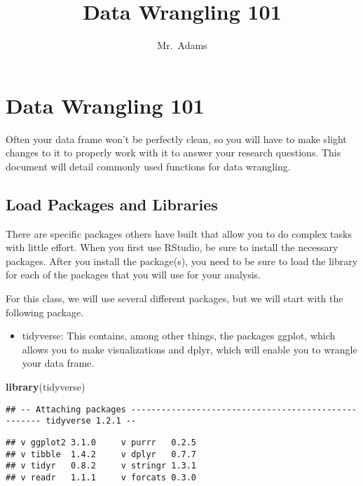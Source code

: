 \documentclass[]{article}
\title{Data Wrangling 101}
\author{Mr.~Adams}
\date{}
\newenvironment{Shaded}{\begin{snugshade}}{\end{snugshade}}
\newcommand{\KeywordTok}[1]{\textcolor[rgb]{0.13,0.29,0.53}{\textbf{#1}}}
\newcommand{\NormalTok}[1]{#1}
\providecommand{\tightlist}{%
  \setlength{\itemsep}{0pt}\setlength{\parskip}{0pt}}
\begin{document}
\maketitle

\section{Data Wrangling 101}\label{data-wrangling-101}

Often your data frame won't be perfectly clean, so you will have to make
slight changes to it to properly work with it to answer your research
questions. This document will detail commonly used functions for data
wrangling.

\subsection{Load Packages and
Libraries}\label{load-packages-and-libraries}

There are specific packages others have built that allow you to do
complex tasks with little effort. When you first use RStudio, be sure to
install the necessary packages. After you install the package(s), you
need to be sure to load the library for each of the packages that you
will use for your analysis.

For this class, we will use several different packages, but we will
start with the following package.

\begin{itemize}
\tightlist
\item
  tidyverse: This contains, among other things, the packages ggplot,
  which allows you to make visualizations and dplyr, which will enable
  you to wrangle your data frame.
\end{itemize}

\begin{Shaded}
\begin{Highlighting}[]
\KeywordTok{library}\NormalTok{(tidyverse)}
\end{Highlighting}
\end{Shaded}

\begin{verbatim}
## -- Attaching packages ---------------------------------------------------- tidyverse 1.2.1 --
\end{verbatim}

\begin{verbatim}
## v ggplot2 3.1.0     v purrr   0.2.5
## v tibble  1.4.2     v dplyr   0.7.7
## v tidyr   0.8.2     v stringr 1.3.1
## v readr   1.1.1     v forcats 0.3.0
\end{verbatim}
\end{document}
